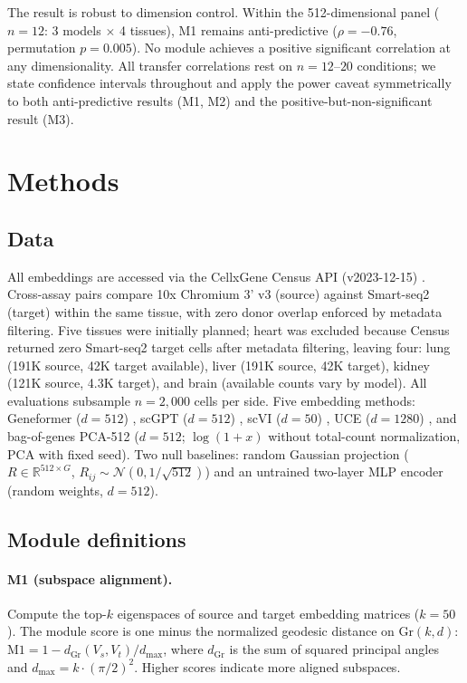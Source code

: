 \documentclass[9pt,lineno]{elife}
\newcommand{\Gr}{\mathrm{Gr}}
\begin{document}
The result is robust to dimension control. Within the 512-dimensional panel ($n = 12$: 3 models $\times$ 4 tissues), M1 remains anti-predictive ($\rho = -0.76$, permutation $p = 0.005$). No module achieves a positive significant correlation at any dimensionality. All transfer correlations rest on $n = 12$--$20$ conditions; we state confidence intervals throughout and apply the power caveat symmetrically to both anti-predictive results (M1, M2) and the positive-but-non-significant result (M3).


\section{Methods}

\subsection{Data}

All embeddings are accessed via the CellxGene Census API (v2023-12-15) \citep{abdulla2025cellxgene}. Cross-assay pairs compare 10x Chromium 3' v3 (source) against Smart-seq2 (target) within the same tissue, with zero donor overlap enforced by metadata filtering. Five tissues were initially planned; heart was excluded because Census returned zero Smart-seq2 target cells after metadata filtering, leaving four: lung (191K source, 42K target available), liver (191K source, 42K target), kidney (121K source, 4.3K target), and brain (available counts vary by model). All evaluations subsample $n = 2{,}000$ cells per side. Five embedding methods: Geneformer ($d = 512$) \citep{theodoris2023geneformer}, scGPT ($d = 512$) \citep{cui2024scgpt}, scVI ($d = 50$) \citep{lopez2018scvi}, UCE ($d = 1280$) \citep{rosen2026uce}, and bag-of-genes PCA-512 ($d = 512$; $\log(1 + x)$ without total-count normalization, PCA with fixed seed). Two null baselines: random Gaussian projection ($R \in \mathbb{R}^{512 \times G}$, $R_{ij} \sim \mathcal{N}(0, 1/\sqrt{512})$) and an untrained two-layer MLP encoder (random weights, $d = 512$).

\subsection{Module definitions}

\paragraph{M1 (subspace alignment).} Compute the top-$k$ eigenspaces of source and target embedding matrices ($k = 50$). The module score is one minus the normalized geodesic distance on $\Gr(k, d)$: $\text{M1} = 1 - d_{\Gr}(V_s, V_t) / d_{\max}$, where $d_{\Gr}$ is the sum of squared principal angles and $d_{\max} = k \cdot (\pi/2)^2$. Higher scores indicate more aligned subspaces.
\end{document}
